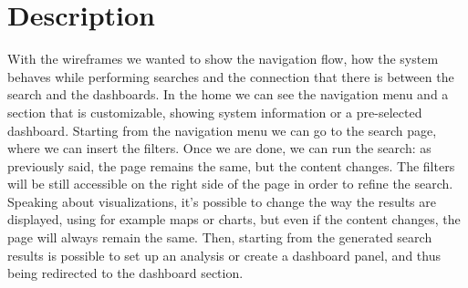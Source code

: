 \documentclass[../main.tex]{subfiles}
\begin{document}
    \section{Description}\label{sec:description2}
    With the wireframes we wanted to show the navigation flow, how the system behaves while performing searches and the connection that there is between the search and the dashboards. In the home we can see the navigation menu and a section that is customizable, showing system information or a pre-selected dashboard. Starting from the navigation menu we can go to the search page, where we can insert the filters. Once we are done, we can run the search: as previously said, the page remains the same, but the content changes. The filters will be still accessible on the right side of the page in order to refine the search. Speaking about visualizations, it's possible to change the way the results are displayed, using for example maps or charts, but even if the content changes, the page will always remain the same. Then, starting from the generated search results is possible to set up an analysis or create a dashboard panel, and thus being redirected to the dashboard section.
\end{document}
